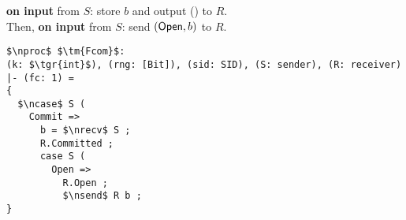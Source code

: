 \begin{bbox}[title={Functionality $\F_{\m{com}}(S, R)$}]

{\bf on input}  from $S$: store $b$ and output () to $R$.\\
Then, {\bf on input}  from $S$: send $(\mathsf{Open}, b)$ to $R$.

\end{bbox}

\begin{lstlisting}[basicstyle=\footnotesize\BeraMonottFamily, frame=single, mathescape, numbers=right]
$\nproc$ $\tm{Fcom}$: 
(k: $\tgr{int}$), (rng: [Bit]), (sid: SID), (S: sender), (R: receiver)  |- (fc: 1) =
{
  $\ncase$ S (
    Commit => 
      b = $\nrecv$ S ;
      R.Committed ;
      case S (
        Open => 
          R.Open ;
          $\nsend$ R b ;
}
\end{lstlisting}